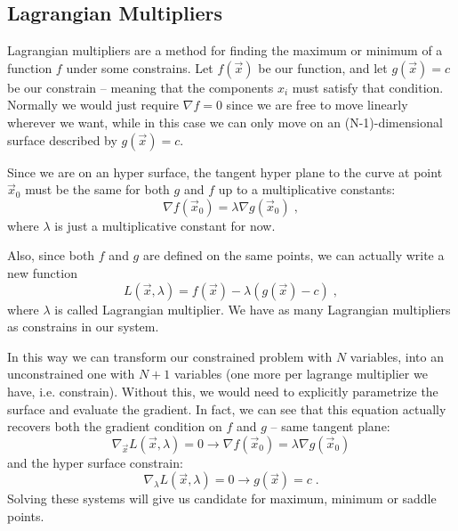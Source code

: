 \documentclass[12pt,a4paper]{article}
\begin{document}
\subsection{Lagrangian Multipliers}
Lagrangian multipliers are a method for finding the maximum or minimum of a function $f$ under some constrains.
Let $f(\vec{x})$ be our function, and let $g(\vec{x})=c$ be our constrain -- meaning that the components $x_i$ must satisfy that condition. Normally we would just require $\nabla f = 0$ since we are free to move linearly wherever we want, while in this case we can only move on an (N-1)-dimensional surface described by $g(\vec{x})=c$.

Since we are on an hyper surface, the tangent hyper plane to the curve at point $\vec{x}_0$ must be the same for both $g$ and $f$ up to a multiplicative constants:
\begin{equation*}
	\nabla f(\vec{x}_0) = \lambda \nabla g(\vec{x}_0)\;,
\end{equation*}
where $\lambda$ is just a multiplicative constant for now.

Also, since both $f$ and $g$ are defined on the same points, we can actually write a new function
\begin{equation*}
	L(\vec{x}, \lambda) = f(\vec{x}) - \lambda (g(\vec{x})-c)\;,
\end{equation*}
where $\lambda$ is called Lagrangian multiplier. We have as many Lagrangian multipliers as constrains in our system.

In this way we can transform our constrained problem with $N$ variables, into an unconstrained one with $N+1$ variables (one more per lagrange multiplier we have, i.e. constrain). Without this, we would need to explicitly parametrize the surface and evaluate the gradient.
In fact, we can see that this equation actually recovers both the gradient condition on $f$ and $g$ -- same tangent plane:
\begin{equation*}
	\nabla_{\vec{x}} L(\vec{x}, \lambda)=0 \rightarrow \nabla f(\vec{x}_0) = \lambda \nabla g(\vec{x}_0)
\end{equation*}
and the hyper surface constrain:
\begin{equation*}
	\nabla_\lambda L(\vec{x}, \lambda)=0 \rightarrow g(\vec{x})=c \;.
\end{equation*}
Solving these systems will give us candidate for maximum, minimum or saddle points.
\end{document}
